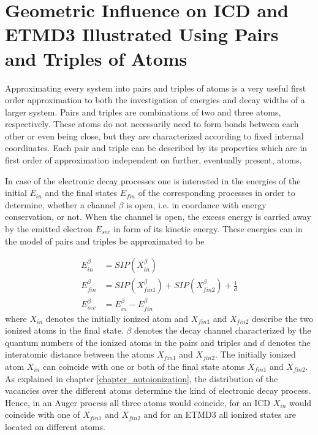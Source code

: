 \chapter{Geometric Influence on ICD and ETMD3  Illustrated Using Pairs and Triples of Atoms}
\label{chapter:geom}
Approximating every system into pairs and triples of atoms is a very useful
first order approximation to both the investigation of energies and
decay widths of a larger system. Pairs and triples are combinations of
two and three atoms, respectively.
These atoms do not necessarily need to form bonds between each other or
even being close, but they are characterized according to fixed internal
coordinates. Each pair and triple can be described by its properties
which are in first order of approximation independent on further, eventually
present, atoms.

In case of the electronic decay processes one is interested in the
energies of the initial $E_{in}$ and the final states $E_{fin}$ of
the corresponding processes in order to determine, whether a channel $\beta$
is open, i.e. in coordance with energy conservation, or not. When the channel
is open, the excess energy is carried away by the emitted electron $E_{sec}$
in form of its kinetic energy. These energies can in the model
of pairs and triples be approximated to be

\begin{align}
 E_{in}^\beta  &= SIP(X_{in}^\beta) \label{equation:E_in}\\
 E_{fin}^\beta &= SIP(X_{fin1}^\beta) + SIP(X_{fin2}^\beta) + \frac 1d
           \label{equation:E_fin}\\
 E_{sec}^\beta &= E_{in}^\beta - E_{fin}^\beta \label{equation:E_sec}
\end{align}
where $X_{in}$ denotes the initially ionized atom and
$X_{fin1}$ and $X_{fin2}$ describe the two ionized
atoms in the final state. $\beta$ denotes the decay channel characterized
by the quantum numbers of the ionized atoms in the pairs
and triples and $d$ denotes the interatomic distance between the atoms
$X_{fin1}$ and $X_{fin2}$. The initially ionized atom $X_{in}$ can
coincide with one or both of
the final state atoms
$X_{fin1}$ and $X_{fin2}$. As explained in
chapter \ref{chapter_autoionization}, the distribution
of the vacancies over the different
atoms determine the kind of electronic decay process. Hence, in an
Auger process all three atoms would coincide, for an ICD $X_{in}$
would coincide with one of $X_{fin1}$ and $X_{fin2}$ and for an \ac{ETMD}3
all ionized states are located on different atoms.

